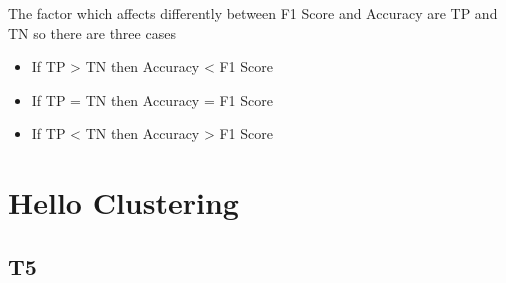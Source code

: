 \documentclass[12pt, a4paper]{article}
\begin{document}
The factor which affects differently between F1 Score and Accuracy are TP and TN so there are three cases

\begin{itemize}
    \item If TP > TN then Accuracy < F1 Score
    \item If TP = TN then Accuracy = F1 Score
    \item If TP < TN then Accuracy > F1 Score
\end{itemize}

\section{Hello Clustering}
\subsection{T5}
\end{document}
